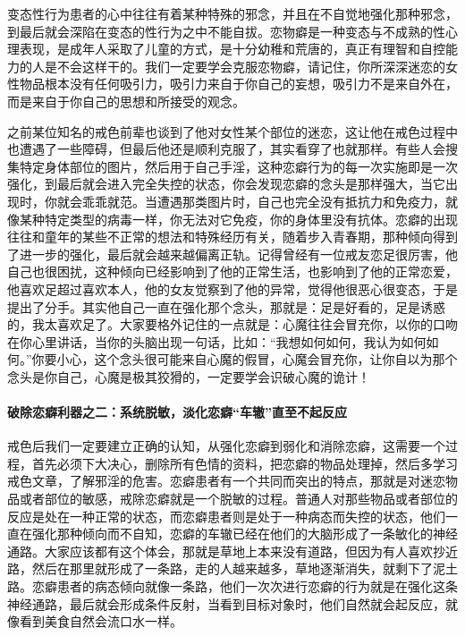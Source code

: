 变态性行为患者的心中往往有着某种特殊的邪念，并且在不自觉地强化那种邪念，到最后就会深陷在变态的性行为之中不能自拔。恋物癖是一种变态与不成熟的性心理表现，是成年人采取了儿童的方式，是十分幼稚和荒唐的，真正有理智和自控能力的人是不会这样干的。我们一定要学会克服恋物癖，请记住，你所深深迷恋的女性物品根本没有任何吸引力，吸引力来自于你自己的妄想，吸引力不是来自外在，而是来自于你自己的思想和所接受的观念。

之前某位知名的戒色前辈也谈到了他对女性某个部位的迷恋，这让他在戒色过程中也遭遇了一些障碍，但最后他还是顺利克服了，其实看穿了也就那样。有些人会搜集特定身体部位的图片，然后用于自己手淫，这种恋癖行为的每一次实施即是一次强化，到最后就会进入完全失控的状态，你会发现恋癖的念头是那样强大，当它出现时，你就会乖乖就范。当遭遇那类图片时，自己也完全没有抵抗力和免疫力，就像某种特定类型的病毒一样，你无法对它免疫，你的身体里没有抗体。恋癖的出现往往和童年的某些不正常的想法和特殊经历有关，随着步入青春期，那种倾向得到了进一步的强化，最后就会越来越偏离正轨。记得曾经有一位戒友恋足很厉害，他自己也很困扰，这种倾向已经影响到了他的正常生活，也影响到了他的正常恋爱，他喜欢足超过喜欢本人，他的女友觉察到了他的异常，觉得他很恶心很变态，于是提出了分手。其实他自己一直在强化那个念头，那就是：足是好看的，足是诱惑的，我太喜欢足了。大家要格外记住的一点就是：心魔往往会冒充你，以你的口吻在你心里讲话，当你的头脑出现一句话，比如：“我想如何如何，我认为如何如何。”你要小心，这个念头很可能来自心魔的假冒，心魔会冒充你，让你自以为那个念头是你自己，心魔是极其狡猾的，一定要学会识破心魔的诡计！

\paragraph{破除恋癖利器之二：系统脱敏，淡化恋癖“车辙”直至不起反应}

戒色后我们一定要建立正确的认知，从强化恋癖到弱化和消除恋癖，这需要一个过程，首先必须下大决心，删除所有色情的资料，把恋癖的物品处理掉，然后多学习戒色文章，了解邪淫的危害。恋癖患者有一个共同而突出的特点，那就是对迷恋物品或者部位的敏感，戒除恋癖就是一个脱敏的过程。普通人对那些物品或者部位的反应是处在一种正常的状态，而恋癖患者则是处于一种病态而失控的状态，他们一直在强化那种倾向而不自知，恋癖的车辙已经在他们的大脑形成了一条敏化的神经通路。大家应该都有这个体会，那就是草地上本来没有道路，但因为有人喜欢抄近路，然后在那里就形成了一条路，走的人越来越多，草地逐渐消失，就剩下了泥土路。恋癖患者的病态倾向就像一条路，他们一次次进行恋癖的行为就是在强化这条神经通路，最后就会形成条件反射，当看到目标对象时，他们自然就会起反应，就像看到美食自然会流口水一样。

